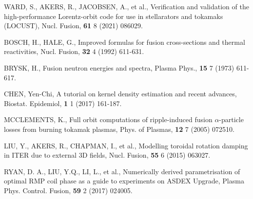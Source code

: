 \documentclass[10pt, a4paper, twoside]{article}
\begin{document}
\begin{thebibliography}{9}
    WARD, S., AKERS, R., JACOBSEN, A., et al.,
    Verification and validation of the high-performance Lorentz-orbit code for use in stellarators and tokamaks (LOCUST),
    Nucl. Fusion,
    \textbf{61} 8
    (2021)
    086029.

    BOSCH, H., HALE, G.,
    Improved formulas for fusion cross-sections and thermal reactivities,
    Nucl. Fusion,
    \textbf{32} 4
    (1992)
    611-631.

    BRYSK, H.,
    Fusion neutron energies and spectra,
    Plasma Phys.,
    \textbf{15} 7
    (1973)
    611-617.

    CHEN, Yen-Chi,
    A tutorial on kernel density estimation and recent advances,
    Biostat. Epidemiol,
    \textbf{1} 1
    (2017)
    161-187.

    MCCLEMENTS, K.,
    Full orbit computations of ripple-induced fusion $\alpha$-particle losses from burning tokamak plasmas,
    Phys. of Plasmas,
    \textbf{12} 7
    (2005)
    072510.


    LIU, Y., AKERS, R., CHAPMAN, I., et al.,
    Modelling toroidal rotation damping in ITER due to external 3D fields,
    Nucl. Fusion,
    \textbf{55} 6
    (2015)
    063027.

    RYAN, D. A., LIU, Y.Q., LI, L., et al.,
    Numerically derived parametrisation of optimal RMP coil phase as a guide to experiments on ASDEX Upgrade,
    Plasma Phys. Control. Fusion,
    \textbf{59} 2 
    (2017) 
    024005.


\end{thebibliography}
\end{document}
